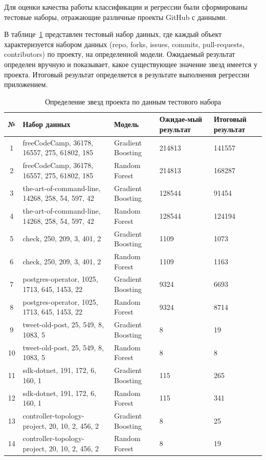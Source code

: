 \newpage
\noindent {}
\label{sec:test}
Для оценки качества работы классификации и регрессии были сформированы тестовые наборы, отражающие различные проекты GitHub с данными.

В таблице~\ref{tab:regr} представлен тестовый набор данных, где каждый объект характеризуется набором данных  (repo, forks, issues, commits, pull-requests, contributors) по проекту, на определенной модели. Ожидаемый результат определен вручную и показывает, какое существующее значение звезд имеется у проекта. Итоговый результат определяется в результате выполнения регрессии приложением.
\begin{table}[H]
    \caption{Определение звезд проекта по данным тестового набора}
    \fontsize{12pt}{1em}\selectfont
    \vspace{1em}
    \begin{tabularx}{\linewidth}{|c|l|X|X|X|}
       \hline
        № & Набор данных & Модель & Ожидае-мый результат & Итоговый результат \\ \hline
 1 & freeCodeCamp, 36178, 16557, 275, 61802, 185 & Gradient Boosting & 214813 &  141557 \\ \hline
 2 & freeCodeCamp, 36178, 16557, 275, 61802, 185 & Random Forest & 214813 &   168287 \\ \hline
 3 & the-art-of-command-line, 14268, 258, 54, 597, 42 & Gradient Boosting  & 128544 &  91454 \\ \hline
 4 & the-art-of-command-line, 14268, 258, 54, 597, 42 & Random Forest  & 128544 &  124194 \\ \hline
 5 & check, 250, 209, 3, 401, 2 & Gradient Boosting  & 1109 &   1073 \\ \hline
 6 & check, 250, 209, 3, 401, 2 & Random Forest  & 1109 &  1163 \\ \hline
 7 & postgres-operator, 1025, 1713, 645, 1453, 22 & Gradient Boosting  & 9324 & 6693 \\ \hline
 8 & postgres-operator, 1025, 1713, 645, 1453, 22 & Random Forest  & 9324 & 8714 \\ \hline
 9 & tweet-old-post, 25, 549, 8, 1083, 5 & Gradient Boosting  & 8 & 19 \\ \hline
 10 & tweet-old-post, 25, 549, 8, 1083, 5 & Random Forest  & 8 & 8 \\ \hline
 11 & sdk-dotnet, 191, 172, 6, 160, 1& Gradient Boosting  & 115 & 265 \\ \hline
 12 & sdk-dotnet, 191, 172, 6, 160, 1& Random Forest  & 115 & 341 \\ \hline
 13 & controller-topology-project, 20, 10, 2, 456, 2 & Gradient Boosting  & 8 & 25 \\ \hline
 14 & controller-topology-project, 20, 10, 2, 456, 2 & Random Forest  & 8 & 19 \\ \hline
        \end{tabularx} 
    \label{tab:regr}
\end{table}
\vspace{1em}

